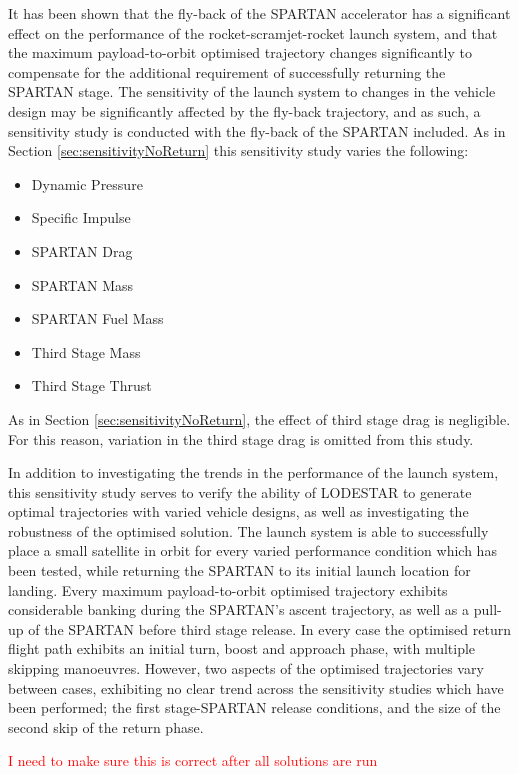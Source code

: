 It has been shown that the fly-back of the SPARTAN accelerator has a significant effect on the performance of the rocket-scramjet-rocket launch system, and that the maximum payload-to-orbit optimised trajectory changes significantly to compensate for the additional requirement of successfully returning the SPARTAN stage. The sensitivity of the launch system to changes in the vehicle design may be significantly affected by the fly-back trajectory, and as such, a sensitivity study is conducted with the fly-back of the SPARTAN included. As in Section \ref{sec:sensitivityNoReturn} this sensitivity study varies the following:
\begin{itemize}
	\item Dynamic Pressure
	\item Specific Impulse
	\item SPARTAN Drag
	\item SPARTAN Mass
	\item SPARTAN Fuel Mass
	\item Third Stage Mass
	\item Third Stage Thrust
\end{itemize}
As in Section \ref{sec:sensitivityNoReturn}, the effect of third stage drag is negligible. For this reason, variation in the third stage drag is omitted from this study. 



In addition to investigating the trends in the performance of the launch system, this sensitivity study serves to verify the ability of LODESTAR to generate optimal trajectories with varied vehicle designs, as well as investigating the robustness of the optimised solution.
The launch system is able to successfully place a small satellite in orbit for every varied performance condition which has been tested, while returning the SPARTAN to its initial launch location for landing. 
Every maximum payload-to-orbit optimised trajectory exhibits considerable banking during the SPARTAN's ascent trajectory, as well as a pull-up of the SPARTAN before third stage release. 
In every case the optimised return flight path exhibits an initial turn, boost and approach phase, with multiple skipping manoeuvres. 
However, two aspects of the optimised trajectories vary between cases, exhibiting no clear trend across the sensitivity studies which have been performed; the first stage-SPARTAN release conditions, and the size of the second skip of the return phase. 

\textcolor{red}{I need to make sure this is correct after all solutions are run}

